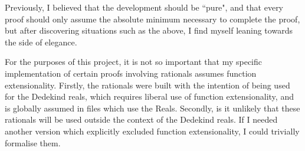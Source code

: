 \documentclass[ProjectReport]{subfiles}
\begin{document}
Previously, I believed that the development should be ``pure", and that every proof should only assume the absolute minimum necessary to complete the proof, but after discovering situations such as the above, I find myself leaning towards the side of elegance. 

For the purposes of this project, it is not so important that my specific implementation of certain proofs involving rationals assumes function extensionality. 
Firstly, the rationals were built with the intention of being used for the Dedekind reals, which requires liberal use of function extensionality, and is globally assumed in files which use the Reals. Secondly, is it unlikely that these rationals will be used outside the context of the Dedekind reals. If I needed another version which explicitly excluded function extensionality, I could trivially formalise them.
\end{document}
